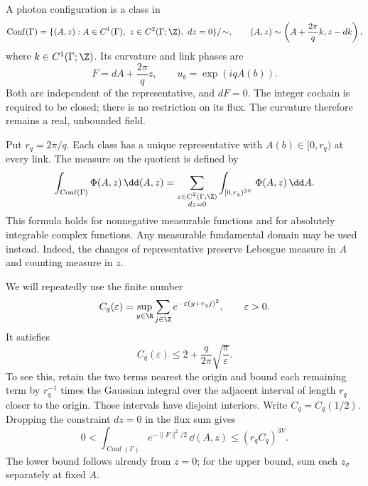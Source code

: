 A photon configuration is a class in
\begin{equation}\label{eq:reg-configuration}
 \operatorname{Conf}(\Gamma)
 =\{(A,z):A\in C^1(\Gamma),\ z\in C^2(\Gamma;\Z),\ dz=0\}/\!\sim,
 \qquad
 (A,z)\sim\left(A+\frac{2\pi}{q}k,z-dk\right),
\end{equation}
where $k\in C^1(\Gamma;\Z)$. Its curvature and link phases are
\begin{equation}\label{eq:reg-curvature}
 F=dA+\frac{2\pi}{q}z,
 \qquad u_b=\exp(iqA(b)).
\end{equation}
Both are independent of the representative, and $dF=0$. The integer
cochain is required to be closed; there is no restriction on its flux.
The curvature therefore remains a real, unbounded field.

Put $r_q=2\pi/q$. Each class has a unique representative with
$A(b)\in[0,r_q)$ at every link. The measure on the quotient is defined
by
\begin{equation}\label{eq:reg-configuration-integral}
 \int_{\operatorname{Conf}(\Gamma)}\Phi(A,z)\,\dd(A,z)
 =\sum_{\substack{z\in C^2(\Gamma;\Z)\\dz=0}}
       \int_{[0,r_q)^{3V}}\Phi(A,z)\,\dd A.
\end{equation}
This formula holds for nonnegative measurable functions and for
absolutely integrable complex functions. Any measurable fundamental
domain may be used instead. Indeed, the changes of representative
preserve Lebesgue measure in $A$ and counting measure in $z$.

We will repeatedly use the finite number
\begin{equation}\label{eq:reg-gaussian-sum}
 C_q(\varepsilon)=\sup_{y\in\R}\sum_{j\in\Z}
                  e^{-\varepsilon(y+r_qj)^2},\qquad \varepsilon>0.
\end{equation}
It satisfies
\[
 C_q(\varepsilon)\le2+\frac{q}{2\pi}\sqrt{\frac{\pi}{\varepsilon}}.
\]
To see this, retain the two terms nearest the origin and bound each
remaining term by $r_q^{-1}$ times the Gaussian integral over the
adjacent interval of length $r_q$ closer to the origin. Those intervals
have disjoint interiors. Write $C_q=C_q(1/2)$. Dropping the constraint
$dz=0$ in the flux sum gives
\begin{equation}\label{eq:reg-maxwell-integral}
 0<\int_{\operatorname{Conf}(\Gamma)}e^{-\|F\|^2/2}\,\dd(A,z)
 \le(r_qC_q)^{3V}.
\end{equation}
The lower bound follows already from $z=0$; for the upper bound, sum
each $z_\sigma$ separately at fixed $A$.

